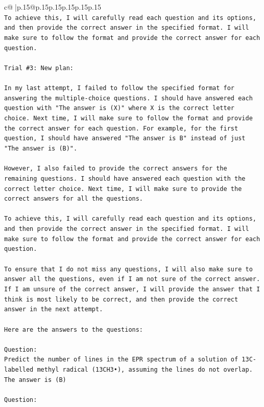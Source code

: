 \documentclass{article}
\begin{document}
{\begin{supertabular}{c@{$\;$}|p{.15\linewidth}@{}p{.15\linewidth}p{.15\linewidth}p{.15\linewidth}p{.15\linewidth}p{.15\linewidth}}
{{{\\ 
\texttt{To achieve this, I will carefully read each question and its options, and then provide the correct answer in the specified format. I will make sure to follow the format and provide the correct answer for each question.} \\
\\ 
\texttt{Trial \#3: New plan: } \\
\\ 
\texttt{In my last attempt, I failed to follow the specified format for answering the multiple{-}choice questions. I should have answered each question with "The answer is (X)" where X is the correct letter choice. Next time, I will make sure to follow the format and provide the correct answer for each question. For example, for the first question, I should have answered "The answer is B" instead of just "The answer is (B)".} \\
\\ 
\texttt{However, I also failed to provide the correct answers for the remaining questions. I should have answered each question with the correct letter choice. Next time, I will make sure to provide the correct answers for all the questions.} \\
\\ 
\texttt{To achieve this, I will carefully read each question and its options, and then provide the correct answer in the specified format. I will make sure to follow the format and provide the correct answer for each question.} \\
\\ 
\texttt{To ensure that I do not miss any questions, I will also make sure to answer all the questions, even if I am not sure of the correct answer. If I am unsure of the correct answer, I will provide the answer that I think is most likely to be correct, and then provide the correct answer in the next attempt.} \\
\\ 
\texttt{Here are the answers to the questions:} \\
\\ 
\texttt{Question:} \\
\texttt{Predict the number of lines in the EPR spectrum of a solution of 13C{-}labelled methyl radical (13CH3•), assuming the lines do not overlap.} \\
\texttt{The answer is (B)} \\
\\ 
\texttt{Question:} \\
}}}
\end{supertabular}}
\end{document}

